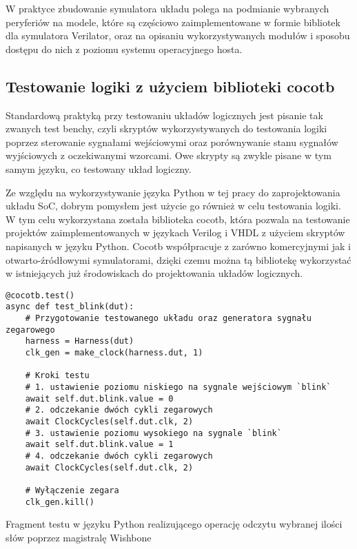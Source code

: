 W praktyce zbudowanie symulatora układu polega na podmianie wybranych peryferiów na modele, które są częściowo zaimplementowane w formie bibliotek dla symulatora Verilator, oraz na opisaniu wykorzystywanych modułów i sposobu dostępu do nich z poziomu systemu operacyjnego hosta.

\subsection{Testowanie logiki z użyciem biblioteki cocotb}

Standardową praktyką przy testowaniu układów logicznych jest pisanie tak zwanych test benchy, czyli skryptów wykorzystywanych do testowania logiki poprzez sterowanie sygnałami wejściowymi oraz porównywanie stanu sygnałów wyjściowych z oczekiwanymi wzorcami. Owe skrypty są zwykle pisane w tym samym języku, co testowany układ logiczny.

Ze względu na wykorzystywanie języka Python w tej pracy do zaprojektowania układu SoC, dobrym pomysłem jest użycie go również w celu testowania logiki. W tym celu wykorzystana została biblioteka cocotb\cite{cocotb:2022:Online}, która pozwala na testowanie projektów zaimplementowanych w językach Verilog i VHDL z użyciem skryptów napisanych w języku Python. Cocotb współpracuje z zarówno komercyjnymi jak i otwarto-źródłowymi symulatorami, dzięki czemu można tą bibliotekę wykorzystać w istniejących już środowiskach do projektowania układów logicznych.

\begin{listing}[H]
\begin{verbatim}
@cocotb.test()
async def test_blink(dut):
    # Przygotowanie testowanego układu oraz generatora sygnału zegarowego
    harness = Harness(dut)
    clk_gen = make_clock(harness.dut, 1)

    # Kroki testu
    # 1. ustawienie poziomu niskiego na sygnale wejściowym `blink`
    await self.dut.blink.value = 0
    # 2. odczekanie dwóch cykli zegarowych
    await ClockCycles(self.dut.clk, 2)
    # 3. ustawienie poziomu wysokiego na sygnale `blink`
    await self.dut.blink.value = 1
    # 4. odczekanie dwóch cykli zegarowych
    await ClockCycles(self.dut.clk, 2)

    # Wyłączenie zegara
    clk_gen.kill()
\end{verbatim}
\caption{\label{lst:tooling-sampletest}Fragment testu w języku Python realizującego operację odczytu wybranej ilości słów poprzez magistralę Wishbone}
\end{listing}

